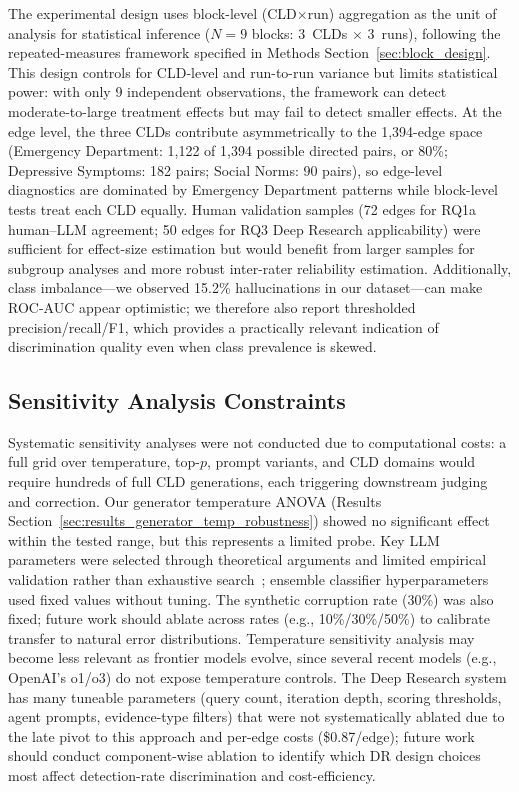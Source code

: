 The experimental design uses block-level (CLD$\times$run) aggregation as the unit of analysis for statistical inference ($N=9$ blocks: 3~CLDs $\times$ 3~runs), following the repeated-measures framework specified in Methods Section~\ref{sec:block_design}. This design controls for CLD-level and run-to-run variance but limits statistical power: with only 9 independent observations, the framework can detect moderate-to-large treatment effects but may fail to detect smaller effects. At the edge level, the three CLDs contribute asymmetrically to the 1,394-edge space (Emergency Department: 1,122 of 1,394 possible directed pairs, or 80\%; Depressive Symptoms: 182 pairs; Social Norms: 90 pairs), so edge-level diagnostics are dominated by Emergency Department patterns while block-level tests treat each CLD equally. Human validation samples (72 edges for RQ1a human--LLM agreement; 50 edges for RQ3 Deep Research applicability) were sufficient for effect-size estimation but would benefit from larger samples for subgroup analyses and more robust inter-rater reliability estimation. Additionally, class imbalance---we observed 15.2\% hallucinations in our dataset---can make ROC-AUC appear optimistic; we therefore also report thresholded precision/recall/F1, which provides a practically relevant indication of discrimination quality even when class prevalence is skewed.

\subsection{Sensitivity Analysis Constraints}

Systematic sensitivity analyses were not conducted due to computational costs: a full grid over temperature, top-$p$, prompt variants, and CLD domains would require hundreds of full CLD generations, each triggering downstream judging and correction. Our generator temperature ANOVA (Results Section~\ref{sec:results_generator_temp_robustness}) showed no significant effect within the tested range, but this represents a limited probe. Key LLM parameters were selected through theoretical arguments and limited empirical validation rather than exhaustive search~\citep{liu2023gevalnlgevaluationusing, zheng2024judging, madaan2023selfrefineiterativerefinementselffeedback}; ensemble classifier hyperparameters used fixed values without tuning. The synthetic corruption rate (30\%) was also fixed; future work should ablate across rates (e.g., 10\%/30\%/50\%) to calibrate transfer to natural error distributions. Temperature sensitivity analysis may become less relevant as frontier models evolve, since several recent models (e.g., OpenAI's o1/o3) do not expose temperature controls. The Deep Research system has many tuneable parameters (query count, iteration depth, scoring thresholds, agent prompts, evidence-type filters) that were not systematically ablated due to the late pivot to this approach and per-edge costs (\$0.87/edge); future work should conduct component-wise ablation to identify which DR design choices most affect detection-rate discrimination and cost-efficiency.

